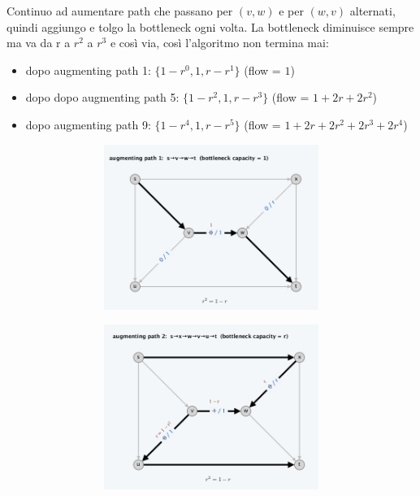 Continuo ad aumentare path che passano per $(v,w)$ e per $(w,v)$ alternati,
quindi aggiungo e tolgo la bottleneck ogni volta. La bottleneck
diminuisce sempre ma va da r a $r^2$ a $r^3$ e così via, così
l'algoritmo non termina mai:
\begin{itemize}
  \item dopo augmenting path 1: $\{ 1 - r^0, 1, r - r^1 \}$ (flow = $1$)
  \item dopo dopo augmenting path 5: $\{ 1 - r^2, 1, r - r^3 \}$ (flow = $1 + 2r + 2r^2$)
  \item dopo augmenting path 9: $\{ 1 - r^4, 1, r - r^5 \}$ (flow = $1 + 2r + 2r^2 + 2r^3 + 2r^4$)\\
\end{itemize}
\begin{figure}[H]
  \begin{subfigure}{\textwidth}
    \centering
    \begin{subfigure}{.33\textwidth}
      \centering
      \includegraphics[width=\linewidth]{capitoli/network_flow/imgs/ex1.png}
    \end{subfigure}%
    \begin{subfigure}{.33\textwidth}
      \centering
      \includegraphics[width=\linewidth]{capitoli/network_flow/imgs/ex2.png}

\end{subfigure}
\end{subfigure}
\end{figure}
